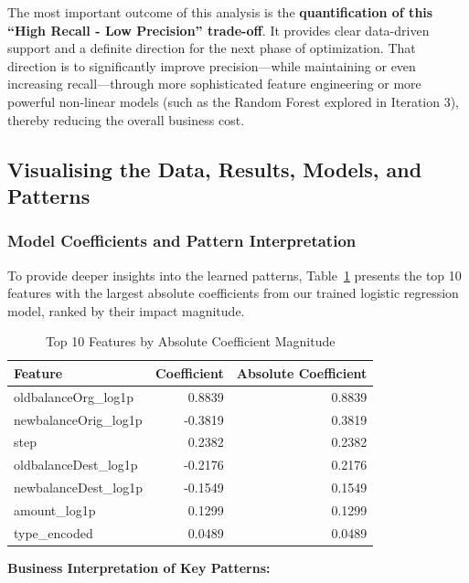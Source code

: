 \documentclass[sigplan,screen]{acmart}
\begin{document}
The most important outcome of this analysis is the \textbf{quantification of this ``High Recall - Low Precision'' trade-off}. It provides clear data-driven support and a definite direction for the next phase of optimization. That direction is to significantly improve precision---while maintaining or even increasing recall---through more sophisticated feature engineering or more powerful non-linear models (such as the Random Forest explored in Iteration 3), thereby reducing the overall business cost.

\subsection{Visualising the Data, Results, Models, and Patterns}

\subsubsection{Model Coefficients and Pattern Interpretation}

To provide deeper insights into the learned patterns, Table~\ref{tab:top-coefficients} presents the top 10 features with the largest absolute coefficients from our trained logistic regression model, ranked by their impact magnitude.

\begin{table}[h]
\caption{Top 10 Features by Absolute Coefficient Magnitude}
\label{tab:top-coefficients}
\centering
\begin{tabular}{|l|r|r|}
\hline
\textbf{Feature} & \textbf{Coefficient} & \textbf{Absolute Coefficient} \\
\hline
oldbalanceOrg\_log1p & 0.8839 & 0.8839 \\
newbalanceOrig\_log1p & -0.3819 & 0.3819 \\
step & 0.2382 & 0.2382 \\
oldbalanceDest\_log1p & -0.2176 & 0.2176 \\
newbalanceDest\_log1p & -0.1549 & 0.1549 \\
amount\_log1p & 0.1299 & 0.1299 \\
type\_encoded & 0.0489 & 0.0489 \\
\hline
\end{tabular}
\end{table}

\textbf{Business Interpretation of Key Patterns:}
\end{document}
